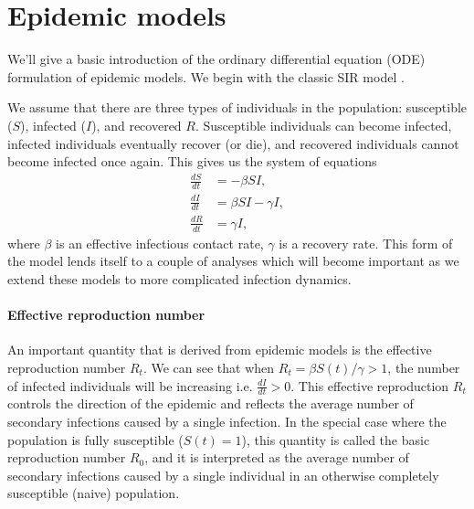 %
%
%
\section{Epidemic models}

We'll give a basic introduction of the ordinary differential equation (ODE) formulation of epidemic models. 
We begin with the classic SIR model \cite{KermackMcKendrick1927}.

We assume that there are three types of individuals in the population: susceptible ($S$), infected ($I$), and recovered $R$. 
Susceptible individuals can become infected, infected individuals eventually recover (or die), and recovered individuals cannot become infected once again. 
This gives us the system of equations
\begin{align}
  \frac{d S}{d t} &= - \beta S I,\\ 
  \frac{d I}{d t} &= \beta S I - \gamma I,\\
  \frac{d R}{d t} &= \gamma I,
\end{align}
where $\beta$ is an effective infectious contact rate, $\gamma$ is a recovery rate. 
This form of the model lends itself to a couple of analyses which will become important as we extend these models to more complicated infection dynamics.

\paragraph{Effective reproduction number}%

An important quantity that is derived from epidemic models is the effective reproduction number $R_t$. 
We can see that when $R_{t} = \beta S(t) / \gamma > 1$, the number of infected individuals will be increasing i.e. $\frac{dI}{dt} > 0$. 
This effective reproduction $R_{t}$ controls the direction of the epidemic and reflects the average number of secondary infections caused by a single infection.
In the special case where the population is fully susceptible ($S(t) = 1$), this quantity is called the basic reproduction number $R_{0}$, and it is interpreted as the average number of secondary infections caused by a single individual in an otherwise completely susceptible (naive) population.

